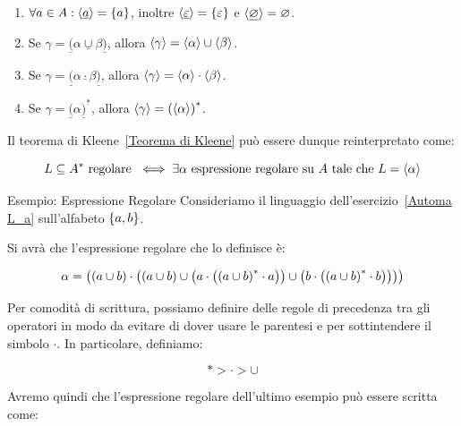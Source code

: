\begin{enumerate}
  \item \(\forall a \in A: \displaystyle{\left\langle{\underline{a}}\right\rangle}=\displaystyle{\left\{{a}\right\}}\), inoltre \(\displaystyle{\left\langle{\underline{\varepsilon}}\right\rangle}=\displaystyle{\left\{{\varepsilon}\right\}}\) e \(\displaystyle{\left\langle{\underline{\varnothing}}\right\rangle}=\varnothing\).
  \item Se \(\gamma = \underline{(}\alpha\underline{\cup}\beta\underline{)}\), allora \(\displaystyle{\left\langle{\gamma}\right\rangle}=\displaystyle{\left\langle{\alpha}\right\rangle}\cup\displaystyle{\left\langle{\beta}\right\rangle}\). %
  \item Se \(\gamma = \underline{(}\alpha\underline{\cdot}\beta\underline{)}\), allora \(\displaystyle{\left\langle{\gamma}\right\rangle}=\displaystyle{\left\langle{\alpha}\right\rangle}\cdot\displaystyle{\left\langle{\beta}\right\rangle}\).  %
  \item Se \(\gamma = \underline{(}\alpha\underline{)}^{\underline{*}}\), allora \(\displaystyle{\left\langle{\gamma}\right\rangle}={(\displaystyle{\left\langle{\alpha}\right\rangle})}^*\). %
\end{enumerate}

Il teorema di Kleene~\ref{Teorema di Kleene} può essere dunque reinterpretato come:

\begin{equation}
  L \subseteq A^* \text{ regolare } \iff \exists \alpha \text{ espressione regolare su } A \text{ tale che } L=\displaystyle{\left\langle{\alpha}\right\rangle}
\end{equation}

\begin{generalbox}
  [colframe=azure-gradient-3!90!black]
  {Esempio: Espressione Regolare}
  Consideriamo il linguaggio dell'esercizio~\ref{Automa L_a} sull'alfabeto \(\displaystyle{\left\{{a,b}\right\}}\).

  Si avrà che l'espressione regolare che lo definisce è:

  \begin{equation}
    \alpha = \displaystyle{\left({\displaystyle{\left({a \cup b }\right)} \cdot \displaystyle{\left({\displaystyle{\left({a \cup b}\right)} \cup  \displaystyle{\left({a \cdot \displaystyle{\left({\displaystyle{\left({a \cup b}\right)}^* \cdot a}\right)}}\right)} \cup \displaystyle{\left({b \cdot \displaystyle{\left({\displaystyle{\left({a\cup b}\right)}^* \cdot b}\right)}}\right)}}\right)}}\right)}
  \end{equation}
\end{generalbox}

Per comodità di scrittura, possiamo definire delle regole di precedenza tra gli operatori in modo da evitare di dover usare le parentesi e per sottintendere il simbolo \(\cdot\). In particolare, definiamo:

\begin{equation}
  * > \cdot > \cup
\end{equation}

Avremo quindi che l'espressione regolare dell'ultimo esempio può essere scritta come:

